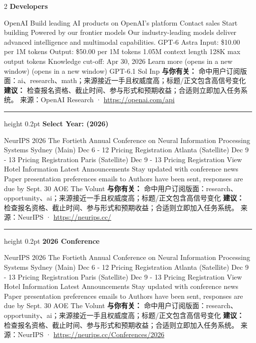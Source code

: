 \documentclass[10.5pt]{ctexart}
\begin{document}
\begin{multicols}{2}
{\large\bfseries Developers}\par
OpenAI Build leading AI products on OpenAI’s platform Contact sales Start building Powered by our frontier models Our industry-leading models deliver advanced intelligence and multimodal capabilities. GPT-6 Astra Input: \$10.00 per 1M tokens Output: \$50.00 per 1M tokens 1.05M context length 128K max output tokens Knowledge cut-off: Apr 30, 2026 Learn more (opens in a new window) (opens in a new window) GPT-6.1 Sol Inp
\textbf{与你有关：} 命中用户订阅版面：ai、research、math；来源接近一手且权威度高；标题/正文包含高信号变化
\textbf{建议：} 检查报名资格、截止时间、参与形式和预期收益；合适则立即加入任务系统。
{\footnotesize\color{ormuted} 来源：OpenAI Research · \url{https://openai.com/api}}
\vspace{2mm}
\hrule height 0.2pt
\vspace{2mm}
{\large\bfseries Select Year: (2026)}\par
NeurIPS 2026 The Fortieth Annual Conference on Neural Information Processing Systems Sydney (Main) Dec 6 - 12 Pricing Registration Atlanta (Satellite) Dec 9 - 13 Pricing Registration Paris (Satellite) Dec 9 - 13 Pricing Registration View Hotel Information Latest Announcements Stay updated with conference news Paper presentation preferences emails to Authors have been sent, responses are due by Sept. 30 AOE The Volunt
\textbf{与你有关：} 命中用户订阅版面：research、opportunity、ai；来源接近一手且权威度高；标题/正文包含高信号变化
\textbf{建议：} 检查报名资格、截止时间、参与形式和预期收益；合适则立即加入任务系统。
{\footnotesize\color{ormuted} 来源：NeurIPS · \url{https://neurips.cc/}}
\vspace{2mm}
\hrule height 0.2pt
\vspace{2mm}
{\large\bfseries 2026 Conference}\par
NeurIPS 2026 The Fortieth Annual Conference on Neural Information Processing Systems Sydney (Main) Dec 6 - 12 Pricing Registration Atlanta (Satellite) Dec 9 - 13 Pricing Registration Paris (Satellite) Dec 9 - 13 Pricing Registration View Hotel Information Latest Announcements Stay updated with conference news Paper presentation preferences emails to Authors have been sent, responses are due by Sept. 30 AOE The Volunt
\textbf{与你有关：} 命中用户订阅版面：research、opportunity、ai；来源接近一手且权威度高；标题/正文包含高信号变化
\textbf{建议：} 检查报名资格、截止时间、参与形式和预期收益；合适则立即加入任务系统。
{\footnotesize\color{ormuted} 来源：NeurIPS · \url{https://neurips.cc/Conferences/2026}}

\end{multicols}
\end{document}
